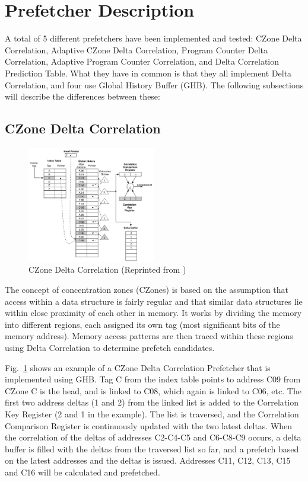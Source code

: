 \documentclass[a4paper]{IEEEtran}
\begin{document}
\section{Prefetcher Description}

A total of 5 different prefetchers have been implemented and tested: CZone Delta Correlation, Adaptive CZone Delta Correlation, Program Counter Delta Correlation, Adaptive Program Counter Correlation, and Delta Correlation Prediction Table. 
What they have in common is that they all implement Delta Correlation, and four use Global History Buffer (GHB). 
The following subsections will describe the differences between these:

\subsection{CZone Delta Correlation}

\begin{figure}[!ht]
  \centering
      \includegraphics[width=0.5\textwidth]{Figures/CDC}
  \caption{CZone Delta Correlation (Reprinted from \protect\cite{acdc})}
  \label{fig:CDC}
\end{figure}

The concept of concentration zones (CZones) is based on the assumption that access within a data structure is fairly regular and that similar data structures lie within close proximity of each other in memory.
It works by dividing the memory into different regions, each assigned its own tag (most significant bits of the memory address).
Memory access patterns are then traced within these regions using Delta Correlation to determine prefetch candidates.

Fig.~\ref{fig:CDC} shows an example of a CZone Delta Correlation Prefetcher that is implemented using GHB. 
Tag C from the index table points to address C09 from CZone C is the head, and is linked to C08,  which again is linked to C06, etc. 
The first two address deltas (1 and 2) from the linked list is added to the Correlation Key Register (2 and 1 in the example). 
The list is traversed, and the Correlation Comparison Register is continuously updated with the two latest deltas. 
When the correlation of the deltas of addresses C2-C4-C5 and C6-C8-C9  occurs, a delta buffer is filled with the deltas from the traversed list so far, and a prefetch based on the latest addresses and the deltas is issued.
Addresses C11, C12, C13, C15 and C16 will be calculated and prefetched.
 
\end{document}

